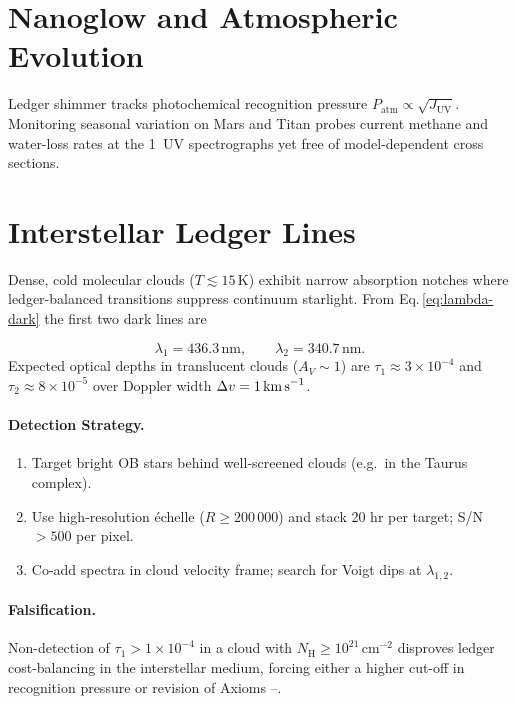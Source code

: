 \documentclass[11pt,oneside]{book}
\begin{document}
{\section{Nanoglow and Atmospheric Evolution}

Ledger shimmer tracks photochemical recognition pressure 
\(P_{\text{atm}}\!\propto\!\sqrt{J_{\mathrm{UV}}}\).
Monitoring seasonal variation on Mars and Titan probes current
methane and water-loss rates at the 1 %
UV spectrographs yet free of model-dependent cross sections.

\section{Interstellar Ledger Lines}

Dense, cold molecular clouds ($T\!\lesssim\!15\,$K) exhibit
narrow absorption notches where ledger-balanced transitions suppress
continuum starlight.
From Eq.\,\eqref{eq:lambda-dark} the first two dark lines are

\[
   \lambda_{1}=436.3\,\text{nm},\qquad
   \lambda_{2}=340.7\,\text{nm}.
\]
Expected optical depths in translucent clouds
($A_{V}\!\sim\!1$) are
\(\tau_{1}\!\approx\!3\times10^{-4}\) and
\(\tau_{2}\!\approx\!8\times10^{-5}\) over Doppler width
\(\Delta v=1\,\text{km\,s}^{-1}\).

\paragraph{Detection Strategy.}
\begin{enumerate}[leftmargin=*,itemsep=3pt]
\item Target bright OB stars behind
      well‐screened clouds (e.g.\ in the Taurus complex).
\item Use high-resolution échelle (\(R\!\ge\!200\,000\))
      and stack 20 hr per target; S/N\,$>500$ per pixel.
\item Co-add spectra in cloud velocity frame; search for
      Voigt dips at \(\lambda_{1,2}\).
\end{enumerate}

\paragraph{Falsification.}
Non-detection of \(\tau_{1}>1\times10^{-4}\) in a cloud with
$N_{\mathrm H}\!\ge\!10^{21}\,\text{cm}^{-2}$ disproves ledger
cost-balancing in the interstellar medium, forcing either a higher
cut-off in recognition pressure or revision of Axioms
–.

}
\end{document}
